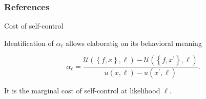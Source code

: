 \documentclass[usenames,dvipsnames,aspectratio=169,11pt, envcountsect]{beamer}
\begin{document}
\begin{comment}

\begin{frame}\frametitle{Model}

	Primitives:

	\vfill

	\begin{itemize}
		\item
		      compact outcome set \(X\);
		      \pause
		\item
		      finite state spaces \(S\) and prior \( p \in \Delta \left( S \right) \);
		\item Blackwell experiment \( F : S \longrightarrow \Delta \left( M \right) \) where \( m \in M \) is a message;
		\item individual chooses action \(f: S \longrightarrow X \).
	\end{itemize}

	\vfill

	Message \( m \) from experiment \( F \) induces a posterior \( p_{F, m} \).

	\vfill

	Choosing action \( f \) at posterior \( p_{F, m} \) induces utility

	\[
		U \left( f, p_{F, m} \right) = \sum_{s} u \left( f_{s} ; p_{F, m} \right) p_{F, m} \left( s \right) +\alpha _{F, m} \sum_{s} u \left( f_{s} ; p^{*}_{F, m} \right) p^{*}_{F, m} \left( s \right) .
	\]

\end{frame}

\end{comment}

\begin{frame}

	\frametitle{References}

	
	


\end{frame}

\appendix

\begin{frame}{Cost of self-control}

	Identification of \( \alpha_{\ell} \) allows elaboratig on its behavioral meaning

	\vfill

	\[
		\alpha_{\ell} = \frac{\mathcal{U} \left( \left\{f, x \right\}, \ell \right) - \mathcal{U} \left( \left\{f, x^{\prime} \right\}, \ell \right) }{u \left( x , \ell \right) - u \left( x^{\prime} , \ell \right)} .
	\]

	\vfill

	It is the marginal cost of self-control at likelihood \( \ell \).

\end{frame}
\end{document}
